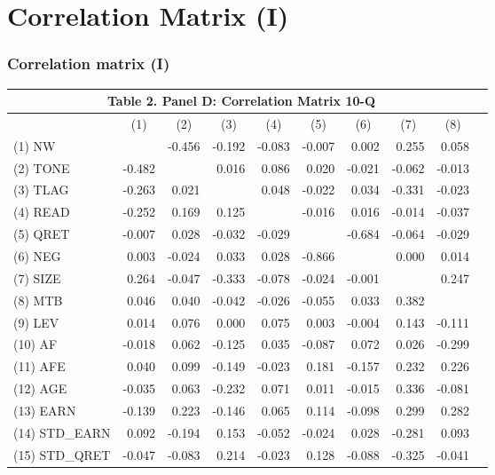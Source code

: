 \documentclass{beamer}
\begin{document}
\section{Correlation Matrix (I)}
\begin{frame}
	\frametitle{Correlation matrix (I)}
	\begin{table}[H] \label{T2PD}
		\centering \scriptsize
		\begin{tabular}{lrrrrrrrrr}
			\multicolumn{9}{c}{\textbf{Table 2. Panel D: Correlation Matrix 10-Q}} \\
			\midrule
			\midrule
			& \multicolumn{1}{c}{(1)} & \multicolumn{1}{c}{(2)} & \multicolumn{1}{c}{(3)} & \multicolumn{1}{c}{(4)} & \multicolumn{1}{c}{(5)} & \multicolumn{1}{c}{(6)} & \multicolumn{1}{c}{(7)} & \multicolumn{1}{c}{(8)} \\
			\midrule
			(1) NW &  & -0.456 & -0.192 & -0.083 & -0.007 & 0.002 & 0.255 & 0.058 & \\
			(2) TONE & -0.482 &  & 0.016 & 0.086 & 0.020 & -0.021 & -0.062 & -0.013 &  \\
			(3) TLAG & -0.263 & 0.021 &  & 0.048 & -0.022 & 0.034 & -0.331 & -0.023 & \\
			(4) READ & -0.252 & 0.169 & 0.125 &  & -0.016 & 0.016 & -0.014 & -0.037 & \\
			(5) QRET & -0.007 & 0.028 & -0.032 & -0.029 &  & -0.684 & -0.064 & -0.029 & \\
			(6) NEG & 0.003 & -0.024 & 0.033 & 0.028 & -0.866 &  & 0.000 & 0.014 &  \\
			(7) SIZE & 0.264 & -0.047 & -0.333 & -0.078 & -0.024 & -0.001 &  & 0.247 & \\
			(8) MTB & 0.046 & 0.040 & -0.042 & -0.026 & -0.055 & 0.033 & 0.382 &  &  \\
			(9) LEV & 0.014 & 0.076 & 0.000 & 0.075 & 0.003 & -0.004 & 0.143 & -0.111 &  \\
			(10) AF & -0.018 & 0.062 & -0.125 & 0.035 & -0.087 & 0.072 & 0.026 & -0.299 &  \\
			(11) AFE & 0.040 & 0.099 & -0.149 & -0.023 & 0.181 & -0.157 & 0.232 & 0.226 &  \\
			(12) AGE & -0.035 & 0.063 & -0.232 & 0.071 & 0.011 & -0.015 & 0.336 & -0.081 &  \\
			(13) EARN & -0.139 & 0.223 & -0.146 & 0.065 & 0.114 & -0.098 & 0.299 & 0.282 &  \\
			(14) STD\_EARN & 0.092 & -0.194 & 0.153 & -0.052 & -0.024 & 0.028 & -0.281 & 0.093 &  \\
			(15) STD\_QRET & -0.047 & -0.083 & 0.214 & -0.023 & 0.128 & -0.088 & -0.325 & -0.041 & \\
			\bottomrule
			\bottomrule
		\end{tabular}%
	\end{table}%
	

\end{frame}
\end{document}
